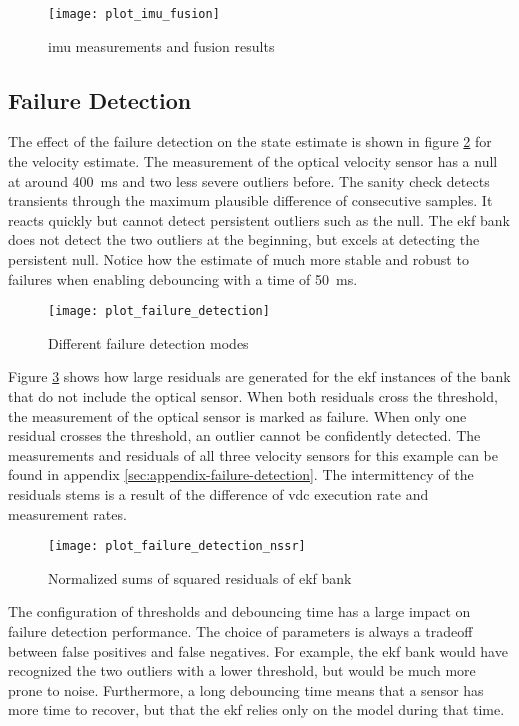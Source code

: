 \begin{figure}[t]
	\centering
	\texttt{[image: plot\_imu\_fusion]}%
	\caption{\gls{imu} measurements and fusion results}
	\label{fig:imu-fusion}
\end{figure}


\subsection{Failure Detection}
The effect of the failure detection on the state estimate is shown in figure \ref{fig:failure-detection} for the velocity estimate. The measurement of the optical velocity sensor has a null at around \SI{400}{\milli\second} and two less severe outliers before. The sanity check detects transients through the maximum plausible difference of consecutive samples. It reacts quickly but cannot detect persistent outliers such as the null. The \gls{ekf} bank does not detect the two outliers at the beginning, but excels at detecting the persistent null. Notice how the estimate of much more stable and robust to failures when enabling debouncing with a time of \SI{50}{\milli\second}.

\begin{figure}[t]
	\centering
	\texttt{[image: plot\_failure\_detection]}%
	\caption{Different failure detection modes}
	\label{fig:failure-detection}
\end{figure}

Figure \ref{fig:failure-detection-nssr} shows how large residuals are generated for the \gls{ekf} instances of the bank that do not include the optical sensor. When both residuals cross the threshold, the measurement of the optical sensor is marked as failure. When only one residual crosses the threshold, an outlier cannot be confidently detected. The measurements and residuals of all three velocity sensors for this example can be found in appendix \ref{sec:appendix-failure-detection}. The intermittency of the residuals stems is a result of the difference of \gls{vdc} execution rate and measurement rates.

\begin{figure}[t]
	\centering
	\texttt{[image: plot\_failure\_detection\_nssr]}%
	\caption{Normalized sums of squared residuals of \gls{ekf} bank}
	\label{fig:failure-detection-nssr}
\end{figure}

The configuration of thresholds and debouncing time has a large impact on failure detection performance. The choice of parameters is always a tradeoff between false positives and false negatives. For example, the \gls{ekf} bank would have recognized the two outliers with a lower threshold, but would be much more prone to noise. Furthermore, a long debouncing time means that a sensor has more time to recover, but that the \gls{ekf} relies only on the model during that time.


